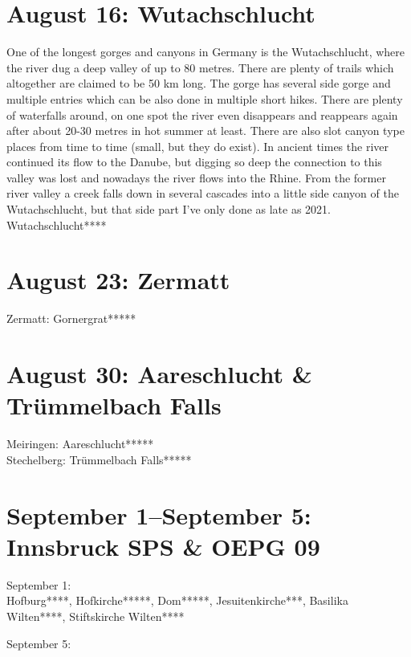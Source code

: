 \section{August 16: Wutachschlucht}
\label{2009:Wutachschlucht}

One of the longest gorges and canyons in Germany is the Wutachschlucht, where the river dug a deep valley of up to 80 metres. There are plenty of trails which altogether are claimed to be 50 km long. The gorge has several side gorge and multiple entries which can be also done in multiple short hikes. There are plenty of waterfalls around, on one spot the river even disappears and reappears again after about 20-30 metres in hot summer at least. There are also slot canyon type places from time to time (small, but they do exist). In ancient times the river continued its flow to the Danube, but digging so deep the connection to this valley was lost and nowadays the river flows into the Rhine. From the former river valley a creek falls down in several cascades into a little side canyon of the Wutachschlucht, but that side part I've only done as late as 2021.\\

Wutachschlucht****

\section{August 23: Zermatt}
\label{2009:Zermatt}



Zermatt: Gornergrat*****

\section{August 30: Aareschlucht \& Tr\"ummelbach Falls}
\label{2009:Aareschlucht}

Meiringen: Aareschlucht*****\\
Stechelberg: Tr\"ummelbach Falls*****

\section{September 1--September 5: Innsbruck SPS \& OEPG 09}
\label{2009:Innsbruck}

September 1:\\

Hofburg****, Hofkirche*****, Dom*****, Jesuitenkirche***, Basilika Wilten****, Stiftskirche Wilten****

September 5:\\

